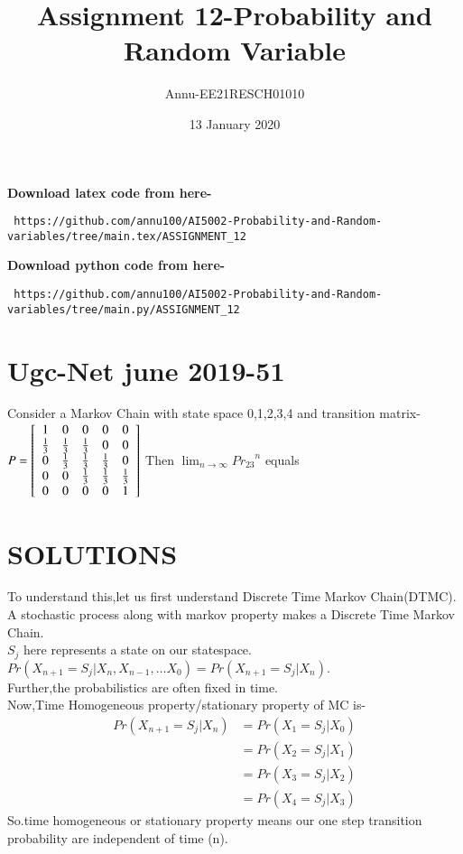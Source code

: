 \documentclass[journel,12pt,twocoloums]{IEEEtran}
\title{Assignment 12-Probability and Random Variable}
\author{Annu-EE21RESCH01010}
\date{13 January 2020}
\begin{document}
 \maketitle
\textbf{Download latex code from here-}\\
\begin{lstlisting}
 https://github.com/annu100/AI5002-Probability-and-Random-variables/tree/main.tex/ASSIGNMENT_12
 \end{lstlisting}
\textbf{Download python code from here-}\\
\begin{lstlisting}
 https://github.com/annu100/AI5002-Probability-and-Random-variables/tree/main.py/ASSIGNMENT_12
 \end{lstlisting}
 \section{Ugc-Net june 2019-51}

Consider a Markov Chain with state space {0,1,2,3,4} and transition matrix-\\

\begin{math}
P=\left[
\begin{array}{c c c c c}
    1 & 0 & 0 & 0 & 0\\
    \frac{1}{3} & \frac{1}{3}  & \frac{1}{3}  & 0 & 0\\
    0 & \frac{1}{3}  & \frac{1}{3}  & \frac{1}{3} & 0\\
    0 & 0 & \frac{1}{3} & \frac{1}{3}  & \frac{1}{3}  \\
    0 & 0 & 0 & 0 & 1
\end{array}\right]
\end{math}
Then $\lim_{n \to \infty } {Pr_{23}}^n$ equals


\section{SOLUTIONS}
To understand this,let us first understand Discrete Time Markov Chain(DTMC).\\
A stochastic process along with markov property makes a Discrete Time Markov Chain.\\
$S_j$ here represents a state on our statespace.
$Pr(X_{n+1}=S_j|X_n,X_{n-1},\ldots X_0)=Pr(X_{n+1}=S_j|X_n).$\\
Further,the probabilistics are often fixed in time.\\
Now,Time Homogeneous property/stationary property of MC is-\\
\begin{align*}
  Pr(X_{n+1}=S_j|X_n) &= Pr(X_1=S_j | X_0)\\
                      &= Pr(X_2=S_j | X_1)\\
                      &= Pr(X_3=S_j | X_2)\\
                      &= Pr(X_4=S_j | X_3) 
\end{align*}
So.time homogeneous or stationary property means our one step transition probability are independent of time (n).\\
\end{document}
